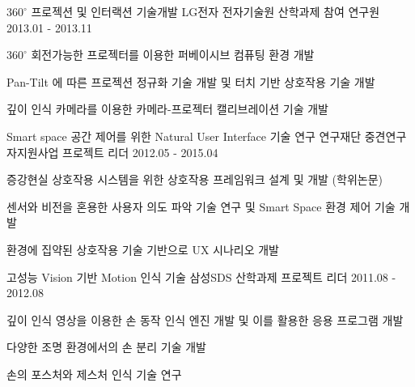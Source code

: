 \begin{cventries}
  \cventry
    {$360^{\circ}$ 프로젝션 및 인터랙션 기술개발} %
    {LG전자 전자기술원 산학과제} %
    {참여 연구원} %
    {2013.01 - 2013.11} %
    {
      \begin{cvitems} %
        \item {$360^{\circ}$ 회전가능한 프로젝터를 이용한 퍼베이시브 컴퓨팅 환경 개발}
        \item {Pan-Tilt 에 따른 프로젝션 정규화 기술 개발 및 터치 기반 상호작용 기술 개발}
        \item {깊이 인식 카메라를 이용한 카메라-프로젝터 캘리브레이션 기술 개발}
      \end{cvitems} 
    }

  \cventry
    {Smart space 공간 제어를 위한 Natural User Interface 기술 연구} %
    {연구재단 중견연구자지원사업} %
    {프로젝트 리더} %
    {2012.05 - 2015.04} %
    {
      \begin{cvitems} %
        \item {증강현실 상호작용 시스템을 위한 상호작용 프레임워크 설계 및 개발 (학위논문)}
        \item {센서와 비전을 혼용한 사용자 의도 파악 기술 연구 및 Smart Space 환경 제어 기술 개발}
        \item {환경에 집약된 상호작용 기술 기반으로 UX 시나리오 개발}
      \end{cvitems}
    }

  \cventry
    {고성능 Vision 기반 Motion 인식 기술} %
    {삼성SDS 산학과제} %
    {프로젝트 리더} %
    {2011.08 - 2012.08} %
    {
      \begin{cvitems} %
        \item {깊이 인식 영상을 이용한 손 동작 인식 엔진 개발 및 이를 활용한 응용 프로그램 개발}
        \item {다양한 조명 환경에서의 손 분리 기술 개발}
        \item {손의 포스처와 제스처 인식 기술 연구}
      \end{cvitems}
    }


\end{cventries}
